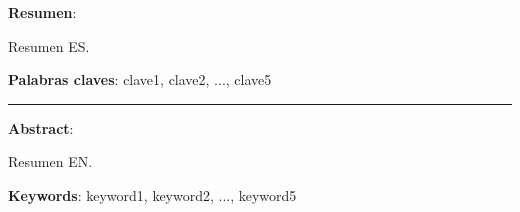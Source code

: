 \textbf{Resumen}:

Resumen ES.

\textbf{Palabras claves}: clave1, clave2, ..., clave5

\vspace{1cm}
\begin{center}
  \rule{0.5\textwidth}{.4pt}
\end{center}
\vspace{1cm}

\textbf{Abstract}:

Resumen EN.

\textbf{Keywords}: keyword1, keyword2, ..., keyword5
